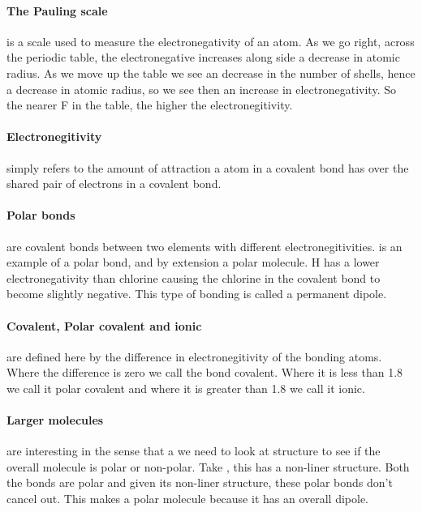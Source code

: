	\paragraph{The Pauling scale} is a scale used to measure the electronegativity of an atom. As we go right, across the periodic table, the electronegative increases along side a decrease in atomic radius. As we move up the table we see an decrease in the number of shells, hence a decrease in atomic radius, so we see then an increase in electronegativity. So the nearer F in the table, the higher the electronegitivity.
	
	\paragraph{Electronegitivity} simply refers to the amount of attraction a atom in a covalent bond has over the shared pair of electrons in a covalent bond.
	
	\paragraph{Polar bonds} are covalent bonds between two elements with different electronegitivities.  is an example of a polar bond, and by extension a polar molecule. H has a lower electronegativity than chlorine causing the chlorine in the covalent bond to become slightly negative. This type of bonding is called a permanent dipole.

	\paragraph{Covalent, Polar covalent and ionic} are defined here by the difference in electronegitivity of the bonding atoms. Where the difference is zero we call the bond covalent. Where it is less than 1.8 we call it polar covalent and where it is greater than 1.8 we call it ionic.
	
	\paragraph{Larger molecules} are interesting in the sense that a we need to look at structure to see if the overall molecule is polar or non-polar. Take , this has a non-liner structure. Both the  bonds are polar and given its non-liner structure, these polar bonds don't cancel out. This makes  a polar molecule because it has an overall dipole.
	
